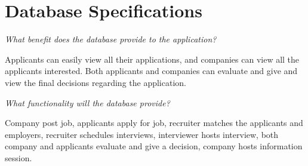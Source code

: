 \section{Database Specifications}

\textit{What benefit does the database provide to the application?} 

Applicants can easily view all their applications, and companies can view all the applicants interested. Both applicants and companies can evaluate and give and view the final decisions regarding the application.

\medskip

\textit{What functionality will the database provide?} 

Company post job, applicants apply for job, recruiter matches the applicants and employers, recruiter schedules interviews, interviewer hosts interview, both company and applicants evaluate and give a decision, company hosts information session.
